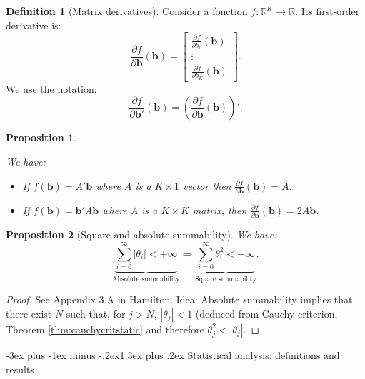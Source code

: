 \documentclass[
  11pt,
]{book}
\makeatletter
\providecommand{\tightlist}{%
  \setlength{\itemsep}{0pt}\setlength{\parskip}{0pt}}
\renewcommand\section{\@startsection{section}{1}{\z@}
  {-3ex plus -1ex minus -.2ex}{1.3ex plus .2ex}
  {\normalfont\Large\bfseries\color{TextbookInk}}}
\newtheorem{proposition}{Proposition}[chapter]
\theoremstyle{definition}
\newtheorem{definition}{Definition}[chapter]
\theoremstyle{definition}
\theoremstyle{definition}
\theoremstyle{definition}
\theoremstyle{remark}
\makeatother
\begin{document}
\begin{definition}[Matrix derivatives]
\protect\hypertarget{def:FOD}{}\label{def:FOD}Consider a fonction \(f: \mathbb{R}^K \rightarrow \mathbb{R}\). Its first-order derivative is:
\[
\frac{\partial f}{\partial \mathbf{b}}(\mathbf{b}) =
\left[\begin{array}{c}
\frac{\partial f}{\partial b_1}(\mathbf{b})\\
\vdots\\
\frac{\partial f}{\partial b_K}(\mathbf{b})
\end{array}
\right].
\]
We use the notation:
\[
\frac{\partial f}{\partial \mathbf{b}'}(\mathbf{b}) = \left(\frac{\partial f}{\partial \mathbf{b}}(\mathbf{b})\right)'.
\]
\end{definition}

\begin{proposition}
\protect\hypertarget{prp:partial}{}\label{prp:partial}

We have:

\begin{itemize}
\tightlist
\item
  If \(f(\mathbf{b}) = A' \mathbf{b}\) where \(A\) is a \(K \times 1\) vector then \(\frac{\partial f}{\partial \mathbf{b}}(\mathbf{b}) = A\).
\item
  If \(f(\mathbf{b}) = \mathbf{b}'A\mathbf{b}\) where \(A\) is a \(K \times K\) matrix, then \(\frac{\partial f}{\partial \mathbf{b}}(\mathbf{b}) = 2A\mathbf{b}\).
\end{itemize}

\end{proposition}

\begin{proposition}[Square and absolute summability]
\protect\hypertarget{prp:absMs}{}\label{prp:absMs}We have:
\[
\underbrace{\sum_{i=0}^{\infty}|\theta_i| < + \infty}_{\mbox{Absolute summability}} \Rightarrow \underbrace{\sum_{i=0}^{\infty} \theta_i^2 < + \infty}_{\mbox{Square summability}}.
\]
\end{proposition}

\begin{proof}
See Appendix 3.A in Hamilton. Idea: Absolute summability implies that there exist \(N\) such that, for \(j>N\), \(|\theta_j| < 1\) (deduced from Cauchy criterion, Theorem \ref{thm:cauchycritstatic} and therefore \(\theta_j^2 < |\theta_j|\).
\end{proof}

\section{Statistical analysis: definitions and results}\label{variousResults}
\end{document}
